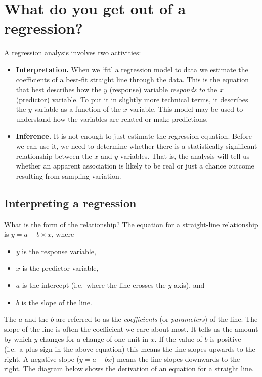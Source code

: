 \documentclass[
]{book}
\begin{document}
\hypertarget{what-do-you-get-out-of-a-regression}{%
\section{What do you get out of a regression?}\label{what-do-you-get-out-of-a-regression}}

A regression analysis involves two activities:

\begin{itemize}
\item
  \textbf{Interpretation.} When we `fit' a regression model to data we estimate the coefficients of a best-fit straight line through the data. This is the equation that best describes how the \(y\) (response) variable \emph{responds to} the \(x\) (predictor) variable. To put it in slightly more technical terms, it describes the \(y\) variable as a function of the \(x\) variable. This model may be used to understand how the variables are related or make predictions.
\item
  \textbf{Inference.} It is not enough to just estimate the regression equation. Before we can use it, we need to determine whether there is a statistically significant relationship between the \(x\) and \(y\) variables. That is, the analysis will tell us whether an apparent association is likely to be real or just a chance outcome resulting from sampling variation.
\end{itemize}

\hypertarget{interpreting-a-regression}{%
\subsection{Interpreting a regression}\label{interpreting-a-regression}}

What is the form of the relationship? The equation for a straight-line relationship is \(y = a + b \times x\), where

\begin{itemize}
\item
  \(y\) is the response variable,
\item
  \(x\) is the predictor variable,
\item
  \(a\) is the intercept (i.e.~where the line crosses the \(y\) axis), and
\item
  \(b\) is the slope of the line.
\end{itemize}

The \(a\) and the \(b\) are referred to as the \emph{coefficients} (or \emph{parameters}) of the line. The slope of the line is often the coefficient we care about most. It tells us the amount by which \(y\) changes for a change of one unit in \(x\). If the value of \(b\) is positive (i.e.~a plus sign in the above equation) this means the line slopes upwards to the right. A negative slope (\(y = a - bx\)) means the line slopes downwards to the right. The diagram below shows the derivation of an equation for a straight line.
\end{document}
